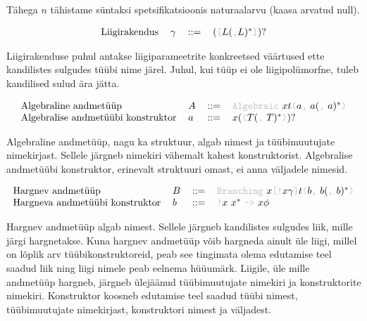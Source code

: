 \documentclass[12pt]{article}
\begin{document}
    Tähega $n$ tähistame süntaksi spetsifikatsioonis naturaalarvu (kaasa arvatud null).

    \begin{equation*}
      \begin{tabular}{llll}
        Liigirakendus & $\gamma$ & $::=$ & $(${\color{helehall}\verb"["}$L(${\color{helehall}\verb","}$L)^*${\color{helehall}\verb"]"}$)?$
      \end{tabular}
    \end{equation*}

    Liigirakenduse puhul antakse liigiparameetrite konkreetsed väärtused ette kandilistes sulgudes tüübi nime järel. Juhul, kui tüüp ei ole liigipolümorfne, tuleb kandilised sulud ära jätta.

    \begin{equation*}
      \begin{tabular}{llll}
        Algebraline andmetüüp              & $A$ & $::=$ & {\color{helehall}\verb!Algebraic!} $xt${\color{helehall}\verb!(!}$a${\color{helehall}\verb!,!} $a(${\color{helehall}\verb!,!} $a)^*${\color{helehall}\verb!)!} \\
        Algebralise andmetüübi konstruktor & $a$ & $::=$ & $x(${\color{helehall}\verb!(!}$T(${\color{helehall}\verb!,!} $T)^*${\color{helehall}\verb!)!}$)?$
      \end{tabular}
    \end{equation*}

    Algebraline andmetüüp, nagu ka struktuur, algab nimest ja tüübimuutujate nimekirjast. Sellele järgneb nimekiri vähemalt kahest konstruktorist. Algebralise andmetüübi konstruktor, erinevalt struktuuri omast, ei anna väljadele nimesid.

    \begin{equation*}
      \begin{tabular}{llll}
        Hargnev andmetüüp               & $B$ & $::=$ & {\color{helehall}\verb!Branching!} $x${\color{helehall}\verb"[!"}$x\gamma${\color{helehall}\verb!]!}$t${\color{helehall}\verb!(!}$b${\color{helehall}\verb!,!} $b(${\color{helehall}\verb!,!} $b)^*${\color{helehall}\verb!)!} \\
        Hargneva andmetüübi konstruktor & $b$ & $::=$ & {\color{helehall}\verb"!"}$x$ $x^*$ {\color{helehall}\verb!->!} $x\phi$
      \end{tabular}
    \end{equation*}

    Hargnev andmetüüp algab nimest. Sellele järgneb kandilistes sulgudes liik, mille järgi hargnetakse. Kuna hargnev andmetüüp võib hargneda ainult üle liigi, millel on lõplik arv tüübikonstruktoreid, peab see tingimata olema edutamise teel saadud liik ning liigi nimele peab eelnema hüüumärk. Liigile, üle mille andmetüüp hargneb, järgneb ülejäänud tüübimuutujate nimekiri ja konstruktorite nimekiri. Konstruktor koosneb edutamise teel saadud tüübi nimest, tüübimuutujate nimekirjast, konstruktori nimest ja väljadest.
\end{document}
